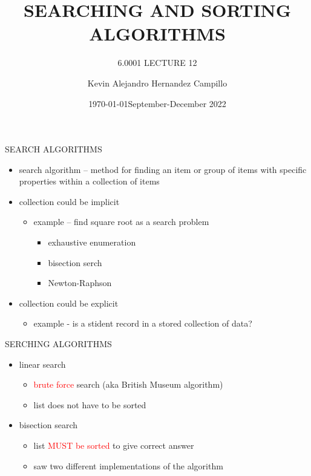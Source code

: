 \documentclass[aspectratio=169]{beamer}
\date{\specialdate\today}
\title[Arrays]{SEARCHING AND SORTING ALGORITHMS}
\subtitle{6.0001 LECTURE 12}
\author{Kevin Alejandro Hernandez Campillo}
\institute[UPV]{Polytechnic University of Victoria}
\date[]{September-December 2022}
\begin{document}
\begin{frame}[plain]
  \titlepage
\end{frame}

\begin{frame}[fragile]{SEARCH ALGORITHMS}

\begin{itemize}
\item search algorithm – method for finding an item or group of items with specific properties within a collection of items

\item collection could be implicit
\begin{itemize}
\item example – find square root as a search problem
\begin{itemize}
\item exhaustive enumeration
\item bisection serch
\item Newton-Raphson
\end{itemize}
\end{itemize}
\item collection could be explicit
\begin{itemize}
\item example - is a stident record in a stored collection of data?
\end{itemize}

\end{itemize}
\end{frame}

\begin{frame}[fragile]{SERCHING ALGORITHMS}
\begin{itemize}
\item linear search
\begin{itemize}
\item  \textcolor{red}{brute force} search (aka British Museum algorithm)
\item list does not have to be sorted
\end{itemize}
\item bisection search
\begin{itemize}
\item list \textcolor{red}{MUST be sorted} to give correct answer
\item saw two different implementations of the algorithm
\end{itemize}
\end{itemize}
\end{frame}
\end{document}

